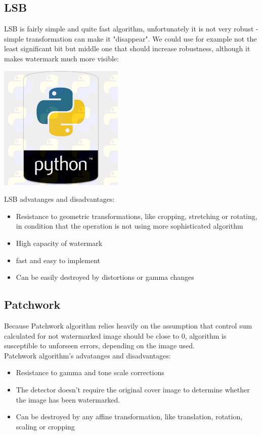 \documentclass[a4paper, 12pt]{article}
\begin{document}
	\subsection{LSB}

	LSB is fairly simple and quite fast algorithm, unfortunately it is not very robust - simple transformation can make it "disappear". We could use for example not the least significant bit but middle one that should increase robustness, although it makes watermark much more visible:

	 \begin{center}
		\includegraphics[scale=0.5]{python_lsb/watermarked_python_4bit.png}
	\end{center}

	LSB advatanges and disadvantages:
	\begin{itemize}
		\item Resistance to geometric transformations, like cropping, stretching or rotating, in condition that the operation is not using more sophisticated algorithm
		\item High capacity of watermark
		\item fast and easy to implement
		\item Can be easily destroyed by distortions or gamma changes
	\end{itemize}

	\subsection{Patchwork}
	
	Because Patchwork algorithm relies heavily on the assumption that control sum calculated for not watermarked image should be close to 0, algorithm is susceptible to unforseen errors, depending on the image used. \\
	
	Patchwork algorithm's advatanges and disadvantages:

	\begin{itemize}
		\item Resistance to gamma and tone scale corrections
		\item The detector doesn’t require the original cover image to determine whether the image has been watermarked.
		\item Can be destroyed by any affine transformation, like translation, rotation, scaling or cropping
	\end{itemize}
\end{document}

